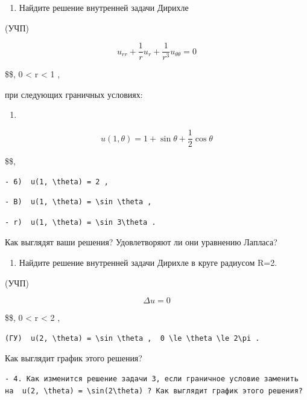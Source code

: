 \documentclass[
  ukrainian,
]{article}
\providecommand{\tightlist}{%
  \setlength{\itemsep}{0pt}\setlength{\parskip}{0pt}}
\begin{document}
\begin{enumerate}
\def\labelenumi{\arabic{enumi}.}
\setcounter{enumi}{1}
\tightlist
\item
  Найдите решение внутренней задачи Дирихле
\end{enumerate}

(УЧП)

\[
u_{rr} + \frac{1}{r} u_r + \frac{1}{r^3} u_{\theta\theta} = 0
\]

\$\$, 0 \textless{} r \textless{} 1 ,

при следующих граничных условиях:

\begin{enumerate}
\def\labelenumi{\alph{enumi})}
\tightlist
\item
\end{enumerate}

\[
u(1, \theta) = 1 + \sin \theta + \frac{1}{2} \cos \theta
\]

\$\$,

\begin{verbatim}
- 6)  u(1, \theta) = 2 ,
\end{verbatim}

\begin{verbatim}
- B)  u(1, \theta) = \sin \theta ,
\end{verbatim}

\begin{verbatim}
- r)  u(1, \theta) = \sin 3\theta .
\end{verbatim}

Как выглядят ваши решения? Удовлетворяют ли они уравнению Лапласа?

\begin{enumerate}
\def\labelenumi{\arabic{enumi}.}
\setcounter{enumi}{2}
\tightlist
\item
  Найдите решение внутренней задачи Дирихле в круге радиусом R=2.
\end{enumerate}

(УЧП)

\[
\Delta u = 0
\]

\$\$, 0 \textless{} r \textless{} 2 ,

\begin{verbatim}
(ГУ)  u(2, \theta) = \sin \theta ,  0 \le \theta \le 2\pi .
\end{verbatim}

Как выглядит график этого решения?

\begin{verbatim}
- 4. Как изменится решение задачи 3, если граничное условие заменить на  u(2, \theta) = \sin(2\theta) ? Как выглядит график этого решения?
\end{verbatim}
\end{document}
